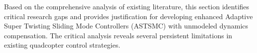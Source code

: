 



Based on the comprehensive analysis of existing literature, this section identifies critical research gaps and provides justification for developing enhanced Adaptive Super Twisting Sliding Mode Controllers (ASTSMC) with unmodeled dynamics compensation. The critical analysis reveals several persistent limitations in existing quadcopter control strategies.


